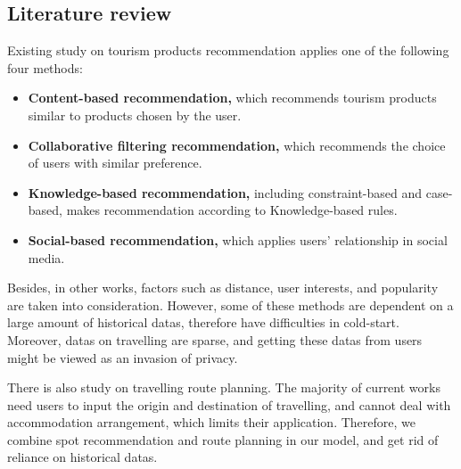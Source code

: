 \documentclass{mcmthesis}
\begin{document}
\subsection{Literature review}
  Existing study on tourism products recommendation applies one of the following four methods\cite{wen2014survey}:
  \begin{itemize}
    \item \textbf{Content-based recommendation,} which recommends tourism products similar to products chosen by the user.
    \item \textbf{Collaborative filtering recommendation,} which recommends the choice of users with similar preference.
    \item \textbf{Knowledge-based recommendation,} including constraint-based\cite{wang2012research} and case-based, makes recommendation according to Knowledge-based rules.
    \item \textbf{Social-based recommendation,} which applies users' relationship in social media.
  \end{itemize}
  Besides, in other works, factors such as distance\cite{Zhang2017GeoPMF}, user interests\cite{Qingxia2016Personalized}, and popularity\cite{li2016personalized} are taken into consideration. However, some of these methods are dependent on a large amount of historical datas, therefore have difficulties in cold-start. Moreover, datas on travelling are sparse, and getting these datas from users might be viewed as an invasion of privacy. \par
  There is also study on travelling route planning\cite{hao2015intellegent}. The majority of current works need users to input the origin and destination of travelling, and cannot deal with accommodation arrangement, which limits their application. Therefore, we combine spot recommendation and route planning in our model, and get rid of reliance on historical datas.

  
\end{document}
